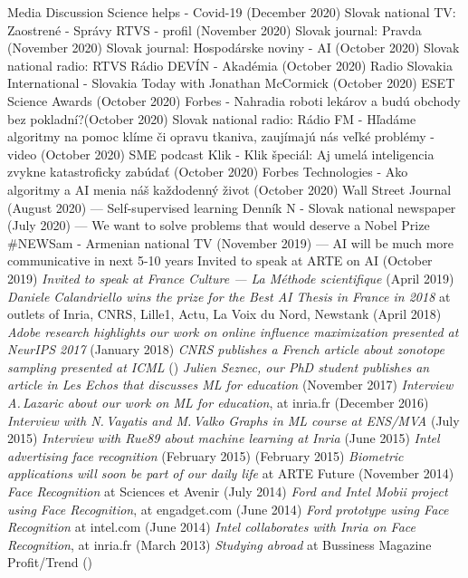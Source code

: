 \documentclass{resume}
\begin{document}

\begin{category}{Media}
\citembullet
Discussion Science helps - Covid-19 ({\sf December 2020})
\citembullet
Slovak national TV: Zaostren\' e - Správy RTVS - profil  ({\sf November 2020})
\citembullet
Slovak journal: Pravda ({\sf November 2020})
\citembullet
Slovak journal: Hospod\'arske noviny - AI ({\sf  October 2020})
\citembullet
Slovak national radio: RTVS R\'adio DEV\'IN - Akad\'emia ({\sf  October 2020})
\citembullet
Radio Slovakia International - Slovakia Today with Jonathan McCormick ({\sf  October 2020})
\citembullet
ESET Science Awards ({\sf  October 2020}) 
\citembullet
Forbes - Nahradia roboti lek\'arov a bud\'u obchody bez pokladn\'i?({\sf  October 2020})
\citembullet
Slovak national radio: Rádio FM - Hľadáme algoritmy na pomoc klíme či opravu tkaniva, zaujímajú nás veľké problémy - video ({\sf  October 2020})
\citembullet
SME podcast Klik - Klik špeciál: Aj umel\'a inteligencia zvykne katastroficky zab\'uda\v{t} ({\sf  October 2020})
\citembullet
Forbes Technologies - Ako algoritmy a AI menia n\'a\v{s}  ka\v{z}dodenný \v{z}ivot ({\sf  October 2020})
\citembullet
Wall Street Journal ({\sf  August 2020}) --- Self-supervised learning
\citembullet
Denn\' ik N - Slovak national newspaper ({\sf  July 2020}) --- We want to solve problems that would deserve a Nobel Prize
\citembullet
\#NEWSam - Armenian national TV ({\sf  November 2019}) --- AI will be much more communicative in next 5-10 years
\citembullet
Invited to speak at ARTE on AI ({\sf October 2019})
\citembullet
\emph{Invited to speak at France Culture --- La M\'ethode scientifique} ({\sf April 2019})
\citembullet
\emph{Daniele Calandriello wins the prize for the Best AI Thesis in France in 2018} 
at outlets of Inria, CNRS, Lille1,  Actu,  La Voix du Nord, Newstank
({\sf April 2018})
\citembullet
\emph{Adobe research highlights our work on online influence maximization presented at NeurIPS 2017} ({\sf January 2018})
\citembullet
\emph{CNRS publishes a French article about zonotope sampling presented at ICML} ({})
\citembullet
\emph{Julien Seznec, our PhD student publishes an article in  Les Echos that discusses ML for education} ({\sf November 2017})
\citembullet
\emph{Interview A.\,Lazaric about our work on ML for education}, at inria.fr ({\sf December 2016})
\citembullet
\emph{Interview with N.\,Vayatis and M.\,Valko Graphs in ML course at ENS/MVA} ({\sf July 2015})
\citembullet
\emph{Interview with Rue89 about machine learning at Inria} ({\sf June 2015})
\citembullet
\emph{Intel advertising face recognition} (February 2015) ({\sf February 2015})
\citembullet
\emph{Biometric applications will soon be part of our daily life} at ARTE Future ({\sf November 2014})
\citembullet
\emph{Face Recognition} at Sciences et Avenir ({\sf July 2014})
\citembullet
\emph{Ford and Intel Mobii project using Face Recognition}, at engadget.com ({\sf June 2014}) 
\citembullet
\emph{Ford prototype using Face Recognition} at intel.com ({\sf June 2014}) 
\citembullet
\emph{Intel collaborates with Inria on Face Recognition}, at inria.fr ({\sf March 2013}) 
\citembullet
\emph{Studying abroad} at Bussiness Magazine Profit/Trend  ({})
 \end{category}
\end{document}
